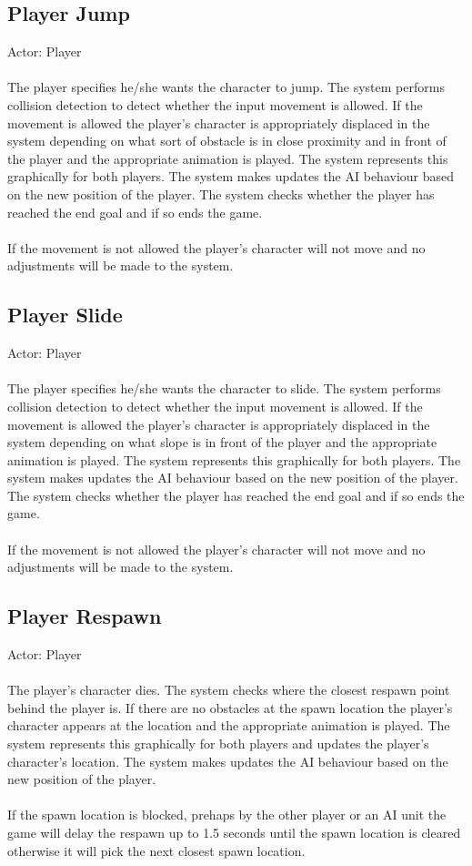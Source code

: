 \documentclass[a4paper,10pt]{article}
\begin{document}
\subsection{Player Jump}
Actor: Player\\\\
The player specifies he/she wants the character to jump. The system performs collision detection to detect whether the input movement is allowed. If the movement is allowed the player's character is appropriately displaced in the system depending on what sort of obstacle is in close proximity and in front of the player and the appropriate animation is played. The system represents this graphically for both players. The system makes updates the AI behaviour based on the new position of the player. The system checks whether the player has reached the end goal and if so ends the game.\\\\
If the movement is not allowed the player's character will not move and no adjustments will be made to the system.
\subsection{Player Slide}
Actor: Player\\\\
The player specifies he/she wants the character to slide. The system performs collision detection to detect whether the input movement is allowed. If the movement is allowed the player's character is appropriately displaced in the system depending on what slope is in front of the player and the appropriate animation is played. The system represents this graphically for both players. The system makes updates the AI behaviour based on the new position of the player. The system checks whether the player has reached the end goal and if so ends the game.\\\\
If the movement is not allowed the player's character will not move and no adjustments will be made to the system.
\subsection{Player Respawn}
Actor: Player\\\\
The player's character dies. The system checks where the closest respawn point behind the player is. If there are no obstacles at the spawn location the player's character appears at the location and the appropriate animation is played. The system represents this graphically for both players and updates the player's character's location.  The system makes updates the AI behaviour based on the new position of the player. \\\\
If the spawn location is blocked, prehaps by the other player or an AI unit the game will delay the respawn up to 1.5 seconds until the spawn location is cleared otherwise it will pick the next closest spawn location.
\newpage
\end{document}
